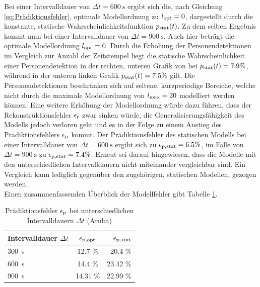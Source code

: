 Bei einer Intervalldauer von $\Delta t = \SI{600}{\second}$ ergibt sich die, nach Gleichung \ref{eq:Prädiktionsfehler}, optimale Modellordnung zu $l_{\mathrm{opt}}=0$, dargestellt durch die konstante, statische Wahrscheinlichkeitsfunktion $p_{\mathrm{stat}}(t)$. Zu dem selben Ergebnis kommt man bei einer Intervalldauer von $\Delta t = \SI{900}{\second}$. Auch hier beträgt die optimale Modellordnung $l_{\mathrm{opt}}=0$. Durch die Erhöhung der Personendetektionen im Vergleich zur Anzahl der Zeitstempel liegt die statische Wahrscheinlichkeit einer Personendetektion in der rechten, unteren Grafik von  bei $p_{\mathrm{stat}}(t) = 7.9 \%$, während in der unteren linken Grafik $p_{\mathrm{stat}}(t) = 7.5 \%$ gilt. Die Personendetektionen beschränken sich auf seltene, kurzperiodige Bereiche, welche nicht durch die maximale Modellordnung von $l_{\mathrm{max}} = 20$ modelliert werden können. Eine weitere Erhöhung der Modellordnung würde dazu führen, dass der Rekonstruktionsfehler $\epsilon_{\mathrm{r}}$ zwar sinken würde, die Generalisierungsfähigkeit des Modells jedoch verloren geht und es in der Folge zu einem Anstieg des Prädiktionsfehlers $\epsilon_{\mathrm{p}}$ kommt. Der Prädiktionsfehler des statischen Modells bei einer Intervalldauer von $\Delta t = \SI{600}{\second}$ ergibt sich zu $\epsilon_{\mathrm{p,stat}} = 6.5 \%$, im Falle von $\Delta t = \SI{900}{\second}$ zu $\epsilon_{\mathrm{p,stat}} = 7.4 \% $. Erneut sei darauf hingewiesen, dass die Modelle mit den unterschiedlichen Intervalldauern nicht miteinander vergleichbar sind. Ein Vergleich kann lediglich gegenüber den zugehörigen, statischen Modellen, gezogen werden.\\
Einen zusammenfassenden Überblick der Modellfehler gibt Tabelle \ref{tab.Prädiktionsfehler aruba_binary}.

\begin{table}[!h]
	\centering
	\caption{Prädiktionsfehler $\epsilon_{\mathrm{p}}$ bei unterschiedlichen Intervalldauern $\Delta t$ (Aruba)}\label{tab.Prädiktionsfehler aruba_binary}
	\vspace*{-3mm}
	\begin{tabular}{lcr}
		\toprule
		Intervalldauer $\Delta t$		& $\epsilon_{\mathrm{p,opt}}$ & $\epsilon_{\mathrm{p,stat}}$              \\
		\midrule
		\SI{300}{\second}	& 12.7 \%         & 20.4 \%  \\
		\rowcolor{Snow2}
		\SI{600}{\second} 	& 14.4 \%        & 23.42 \% \\
		\SI{900}{\second}   & 14.31 \%  & 22.99 \%	\\
		\bottomrule
	\end{tabular} 
\end{table}

